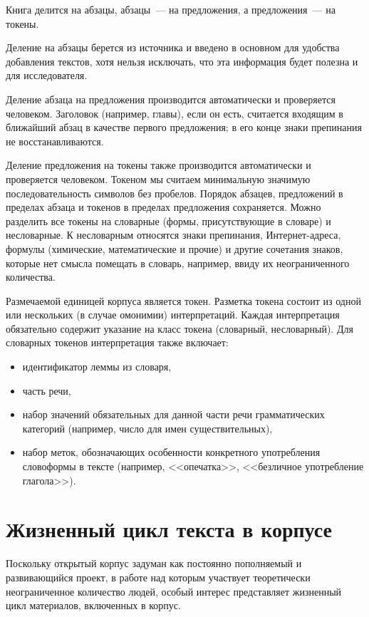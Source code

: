\documentclass[a4paper]{article}
\begin{document}
Книга делится на абзацы, абзацы~--- на предложения, а предложения~--- на токены.

Деление на абзацы берется из источника и введено в основном для удобства добавления текстов, хотя нельзя исключать, что эта информация будет полезна и для исследователя.

Деление абзаца на предложения производится автоматически и проверяется человеком.  Заголовок (например, главы), если он есть, считается входящим в ближайший абзац в качестве первого предложения; в его конце знаки препинания не восстанавливаются.

Деление предложения на токены также производится автоматически и проверяется человеком.  Токеном мы считаем минимальную значимую последовательность символов без пробелов. Порядок абзацев, предложений в пределах абзаца и токенов в пределах предложения сохраняется. Можно разделить все токены на словарные (формы, присутствующие в словаре) и несловарные. К несловарным относятся знаки препинания, Интернет-адреса, формулы (химические, математические и прочие) и другие сочетания знаков, которые нет смысла помещать в словарь, например, ввиду их неограниченного количества.

Размечаемой единицей корпуса является токен. Разметка токена состоит из одной или нескольких (в случае омонимии) интерпретаций. Каждая интерпретация обязательно содержит указание на класс токена (словарный, несловарный). Для словарных токенов интерпретация также включает:
\begin{itemize}
\item идентификатор леммы из словаря,
\item часть речи,
\item набор значений обязательных для данной части речи грамматических категорий (например, число для имен существительных),
\item набор меток, обозначающих особенности конкретного употребления словоформы в тексте (например, <<опечатка>>, <<безличное употребление глагола>>).
\end{itemize}
\section{Жизненный цикл текста в корпусе}
Поскольку открытый корпус задуман как постоянно пополняемый и развивающийся проект, в работе над которым участвует теоретически неограниченное количество людей, особый интерес представляет жизненный цикл материалов, включенных в корпус.
\end{document}
